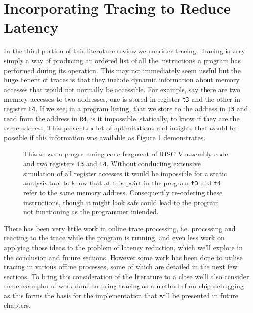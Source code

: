 \section{Incorporating Tracing to Reduce Latency}

\label{sec:tracing}

In the third portion of this literature review we consider tracing. Tracing is very simply a way of producing an ordered list of all the instructions a program has performed during its operation. This may not immediately seem useful but the huge benefit of traces is that they include dynamic information about memory accesses that would not normally be accessible. For example, say there are two memory accesses to two addresses, one is stored in register \texttt{t3} and the other in register \texttt{t4}. If we see, in a program listing, that we store to the address in \texttt{t3} and read from the address in \texttt{R4}, is it impossible, statically, to know if they are the same address. This prevents a lot of optimisations and insights that would be possible if this information was available as Figure \ref{fig:static-analysis-problem} demonstrates.

\begin{figure}[h]
	
	\label{fig:static-analysis-problem}
	\caption[The Limitations of Static Analysis]{This shows a programming code fragment of RISC-V assembly code and two registers \texttt{t3} and \texttt{t4}. Without conducting extensive simulation of all register accesses it would be impossible for a static analysis tool to know that at this point in the program \texttt{t3} and \texttt{t4} refer to the same memory address. Consequently re-ordering these instructions, though it might look safe could lead to the program not functioning as the programmer intended.}
\end{figure}

There has been very little work in online trace processing, i.e. processing and reacting to the trace while the program is running, and even less work on applying those ideas to the problem of latency reduction, which we'll explore in the conclusion and future sections. However some work has been done to utilise tracing in various offline processes, some of which are detailed in the next few sections. To bring this consideration of the literature to a close we'll also consider some examples of work done on using tracing as a method of on-chip debugging as this forms the basis for the implementation that will be presented in future chapters.

